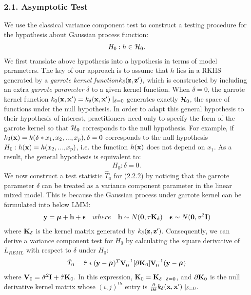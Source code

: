 \documentclass[11pt]{article}
\begin{document}
\subsubsection*{{2.1. Asymptotic Test}}
We use the classical variance component test to construct a testing procedure for the hypothesis about Gaussian process function:
\begin{align}
H_0: h \in {\cal H}_0.
\end{align}
We first translate above hypothesis into a hypothesis in terms of model parameters. The key of our approach is to assume that $h$ lies in a RKHS generated by a \textsl{garrote kernel function}$k_{\delta}({\bf z}, {\bf z}')$, which is constructed by including an extra \textsl{garrote parameter} $\delta$ to a given kernel function. When $\delta=0$, the garrote kernel function $k_0({\bf x}, {\bf x}')=k_{\delta}({\bf x}, {\bf x}')\mid _{\delta=0}$ generates exactly ${\cal H}_0$, the space of functions under the null hypothesis. In order to adapt this general hypothesis to their hypothesis of interest, practitioners need only to specify the form of the garrote kernel so that ${\cal H}_0$ corresponds to the null hypothesis. For example, if $k_{\delta}({\bf x})=k(\delta * x_1, x_2,..., x_p), \delta=0$ corresponds to the null hypothesis $H_0: h({\bf x})=h(x_2,...,x_p)$, i.e. the function $h({\bf x})$ does not depend on $x_1$. As a result, the general hypothesis is equivalent to:
\begin{align}
H_0: \delta=0.
\end{align}
We now construct a test statistic $\hat{T}_0$ for (2.2.2) by noticing that the garrote parameter $\delta$ can be treated as a variance component parameter in the linear mixed model. This is because the Gaussian process under garrote kernel can be formulated into below LMM:
\begin{align*}
{\bf y}=\boldsymbol{\mu}+{\bf h}+\boldsymbol{\epsilon} \quad where \quad {\bf h} \sim N(\mathbf{0}, \tau {\bf K}_\delta) \quad \boldsymbol{\epsilon} \sim N(\mathbf{0}, \sigma^2{\bf I})
\end{align*}
where ${\bf K}_\delta$ is the kernel matrix generated by $k_{\delta}({\bf z}, {\bf z}')$. Consequently, we can derive a variance component test for $H_0$ by calculating the square derivative of $L_{REML}$ with respect to $\delta$ under $H_0$:
\begin{align}
\hat{T}_0=\hat{\tau}*({\bf y}-\hat{\boldsymbol{\mu}})^T{\bf V}_0^{-1}[\partial {\bf K}_0]{\bf V}_0^{-1}({\bf y}-\hat{\boldsymbol{\mu}})
\end{align}
where ${\bf V}_0=\hat{\sigma}^2{\bf I}+\hat{\tau}{\bf K}_0$. In this expression, ${\bf K}_0={\bf K}_\delta \mid_{\delta=0}$, and $\partial {\bf K}_0$ is the null derivative kernel matrix whose $(i, j)^{th}$ entry is $\frac{\partial }{\partial \delta}k_\delta({\bf x}, {\bf x}') \mid_{\delta=0}$.
\end{document}
